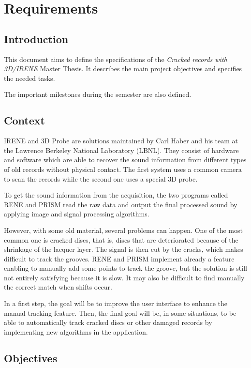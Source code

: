 \chapter{Requirements}

\section{Introduction}

This document aims to define the specifications of the \emph{Cracked records with 3D/IRENE} Master Thesis. It describes the main project objectives and specifies the needed tasks.

The important milestones during the semester are also defined.

\section{Context}

IRENE and 3D Probe are solutions maintained by Carl Haber and his team at the Lawrence Berkeley National Laboratory (LBNL). They consist of hardware and software which are able to recover the sound information from different types of old records without physical contact. The first system uses a common camera to scan the records while the second one uses a special 3D probe.

To get the sound information from the acquisition, the two programs called RENE and PRISM read the raw data and output the final processed sound by applying image and signal processing algorithms.

However, with some old material, several problems can happen. One of the most common one is cracked discs, that is, discs that are deteriorated because of the shrinkage of the lacquer layer. The signal is then cut by the cracks, which makes difficult to track the grooves. RENE and PRISM implement already a feature enabling to manually add some points to track the groove, but the solution is still not entirely satisfying because it is slow. It may also be difficult to find manually the correct match when shifts occur.

In a first step, the goal will be to improve the user interface to enhance the manual tracking feature. Then, the final goal will be, in some situations, to be able to automatically track cracked discs or other damaged records by implementing new algorithms in the application.

\section{Objectives}

